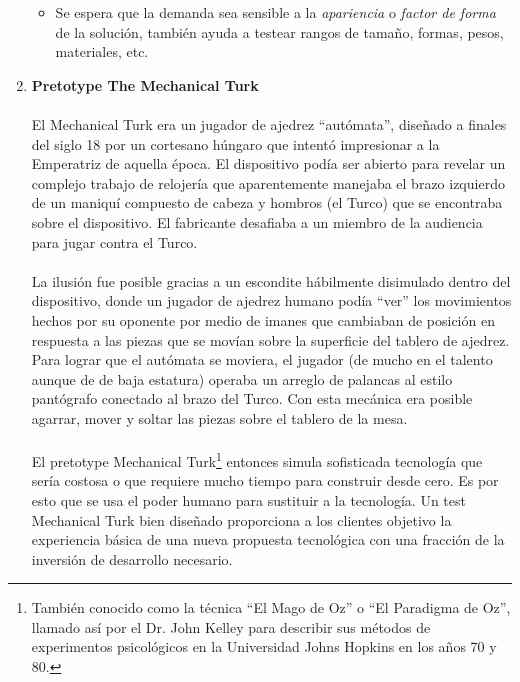 \documentclass{article}
\begin{document}
\begin{enumerate}
\begin{itemize}
\item Se espera que la demanda sea sensible a la \textit{apariencia} o \textit{factor de forma} de la soluci\'on, tambi\'en ayuda a testear rangos de tama\~no, formas, pesos, materiales, etc.

\end{itemize}

\item \textbf{Pretotype The Mechanical Turk}
\\ \\
El Mechanical Turk era un jugador de ajedrez ``aut\'omata'', dise\~nado a finales del siglo 18 por un cortesano h\'ungaro que intent\'o impresionar a la Emperatriz de aquella \'epoca. El dispositivo pod\'ia ser abierto para revelar un complejo trabajo de relojer\'ia que aparentemente manejaba el brazo izquierdo de un maniqu\'i compuesto de cabeza y hombros (el Turco) que se encontraba sobre el dispositivo. El fabricante desafiaba a un miembro de la audiencia para jugar contra el Turco.
\\ \\
 La ilusi\'on fue posible gracias a un escondite h\'abilmente disimulado dentro del dispositivo, donde un jugador de ajedrez humano pod\'ia ``ver'' los movimientos hechos por su oponente por medio de imanes que cambiaban de posici\'on en respuesta a las piezas que se mov\'ian sobre la superficie del tablero de ajedrez. Para lograr que el aut\'omata se moviera, el jugador (de mucho en el talento aunque de de baja estatura) operaba un arreglo de palancas al estilo pant\'ografo conectado al brazo del Turco. Con esta mec\'anica era posible agarrar, mover y soltar las piezas sobre el tablero de la mesa.
 \\ \\
 El pretotype Mechanical Turk\footnote{Tambi\'en conocido como la t\'ecnica  ``El Mago de Oz'' o ``El Paradigma de Oz'', llamado as\'i por el Dr. John Kelley para describir sus m\'etodos de experimentos psicol\'ogicos en la Universidad Johns Hopkins en los a\~nos 70 y 80.} entonces simula sofisticada tecnolog\'ia que ser\'ia costosa o que requiere mucho tiempo para construir desde cero. Es por esto que se usa el poder humano para sustituir a la tecnolog\'ia. Un test Mechanical Turk bien dise\~nado proporciona a los clientes objetivo la experiencia b\'asica de una nueva propuesta tecnol\'ogica con una fracci\'on de la inversi\'on de desarrollo necesario.
 

\end{enumerate}
\end{document}
